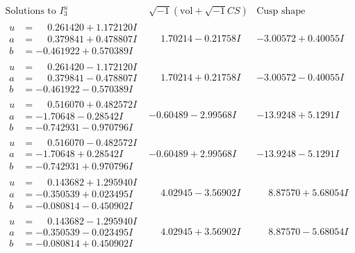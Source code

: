 \documentclass[1p]{elsarticle_modified}
\theoremstyle{definition}
\newcommand{\I}{\sqrt{-1}}
\begin{document}
$$\begin{array}{c|c|c}  
\text{Solutions to }I^u_{3}& \I (\text{vol} + \sqrt{-1}CS) & \text{Cusp shape}\\
 \hline 
\begin{aligned}
u &= \phantom{-}0.261420 + 1.172120 I \\
a &= \phantom{-}0.379841 + 0.478807 I \\
b &= -0.461922 + 0.570389 I\end{aligned}
 & \phantom{-}1.70214 - 0.21758 I & -3.00572 + 0.40055 I \\ \hline\begin{aligned}
u &= \phantom{-}0.261420 - 1.172120 I \\
a &= \phantom{-}0.379841 - 0.478807 I \\
b &= -0.461922 - 0.570389 I\end{aligned}
 & \phantom{-}1.70214 + 0.21758 I & -3.00572 - 0.40055 I \\ \hline\begin{aligned}
u &= \phantom{-}0.516070 + 0.482572 I \\
a &= -1.70648 - 0.28542 I \\
b &= -0.742931 - 0.970796 I\end{aligned}
 & -0.60489 - 2.99568 I & -13.9248 + 5.1291 I \\ \hline\begin{aligned}
u &= \phantom{-}0.516070 - 0.482572 I \\
a &= -1.70648 + 0.28542 I \\
b &= -0.742931 + 0.970796 I\end{aligned}
 & -0.60489 + 2.99568 I & -13.9248 - 5.1291 I \\ \hline\begin{aligned}
u &= \phantom{-}0.143682 + 1.295940 I \\
a &= -0.350539 + 0.023495 I \\
b &= -0.080814 - 0.450902 I\end{aligned}
 & \phantom{-}4.02945 - 3.56902 I & \phantom{-}8.87570 + 5.68054 I \\ \hline\begin{aligned}
u &= \phantom{-}0.143682 - 1.295940 I \\
a &= -0.350539 - 0.023495 I \\
b &= -0.080814 + 0.450902 I\end{aligned}
 & \phantom{-}4.02945 + 3.56902 I & \phantom{-}8.87570 - 5.68054 I \\ \hline\begin{aligned}

\end{aligned}
\end{array}$$
\end{document}
